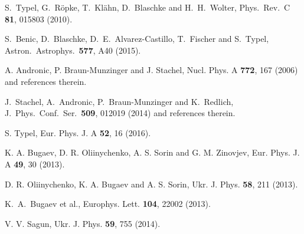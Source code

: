 \documentclass[12pt]{article}
\begin{document}
\begin{thebibliography}{99}
  S.~Typel, G.~R\"opke, T.~Kl\"ahn, D.~Blaschke and H.~H.~Wolter,
   Phys.\ Rev.\ C {\bf 81}, 015803 (2010).

  S.~Benic, D.~Blaschke, D.~E.~Alvarez-Castillo, T.~Fischer and S.~Typel,
  Astron.\ Astrophys.\  {\bf 577}, A40 (2015).


%
 A. Andronic, P. Braun-Munzinger and  J. Stachel, Nucl. Phys. A {\bf 772},  167 (2006) and references therein.
 
  J.~Stachel, A.~Andronic, P.~Braun-Munzinger and K.~Redlich,
  J.\ Phys.\ Conf.\ Ser.\  {\bf 509}, 012019 (2014) and references therein.

%  
S. Typel, Eur. Phys. J. A {\bf 52}, 16 (2016). 
 
K. A. Bugaev, D. R. Oliinychenko,   A. S. Sorin and G. M. Zinovjev, 
Eur. Phys. J. A {\bf 49}, 30  (2013). 
 
%
D. R. Oliinychenko, K. A. Bugaev and  A. S. Sorin, 
Ukr. J. Phys.  {\bf 58},  211 (2013). 
 
 K.~A.~Bugaev et al., 
 Europhys. Lett. {\bf 104},  22002  (2013).
 
 V. V. Sagun, Ukr. J. Phys. {\bf 59}, 755 (2014). 


\end{thebibliography}
\end{document}
